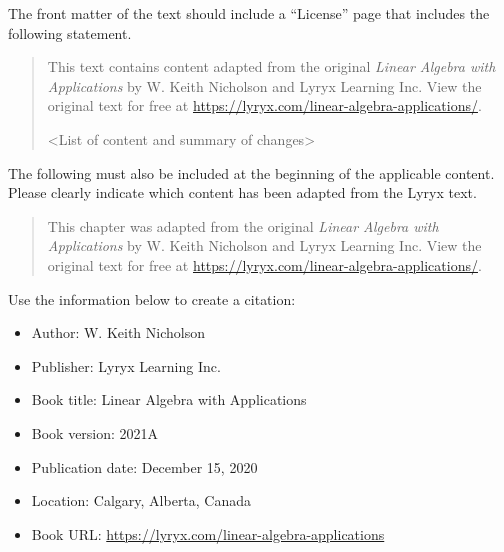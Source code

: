 {The front matter of the text should include a ``License'' page that includes the following statement.

\begin{quotation}\vspace*{-1em}
\noindent This text contains content adapted from the original \textit{Linear Algebra with Applications} by W. Keith Nicholson and Lyryx Learning Inc. View the original text for free at \url{https://lyryx.com/linear-algebra-applications/}.

<List of content and summary of changes>
\end{quotation}\vspace*{-1em}

\hangindent=15pt The following must also be included at the beginning of the applicable content. Please clearly indicate which content has been adapted from the Lyryx text.

\begin{quotation}\vspace*{-1em}
\noindent This chapter was adapted from the original \textit{Linear Algebra with Applications} by W. Keith Nicholson and Lyryx Learning Inc. View the original text for free at \url{https://lyryx.com/linear-algebra-applications/}.
\end{quotation}\vspace*{-1em}

}

\noindent {\fontsize{12pt}{20pt}\subheaderfont\textcolor{secondarycolour}{Citation}}
\vspace*{-0.5em}

{\footnotesize
\noindent Use the information below to create a citation:

\vspace*{-2em}
\begin{itemize}
\item[] Author: W. Keith Nicholson
\item[] Publisher: Lyryx Learning Inc.
\item[] Book title: Linear Algebra with Applications
\item[] Book version: 2021A
\item[] Publication date: December 15, 2020
\item[] Location: Calgary, Alberta, Canada
\item[] Book URL: \url{https://lyryx.com/linear-algebra-applications}
\end{itemize}
}

{\footnotesize
\noindent {\subheaderfont\textcolor{secondarycolour}{For questions or comments please contact }\textcolor{primarycolour}{editorial@lyryx.com}}}

\setlength{\parskip}{\baselineskip}

